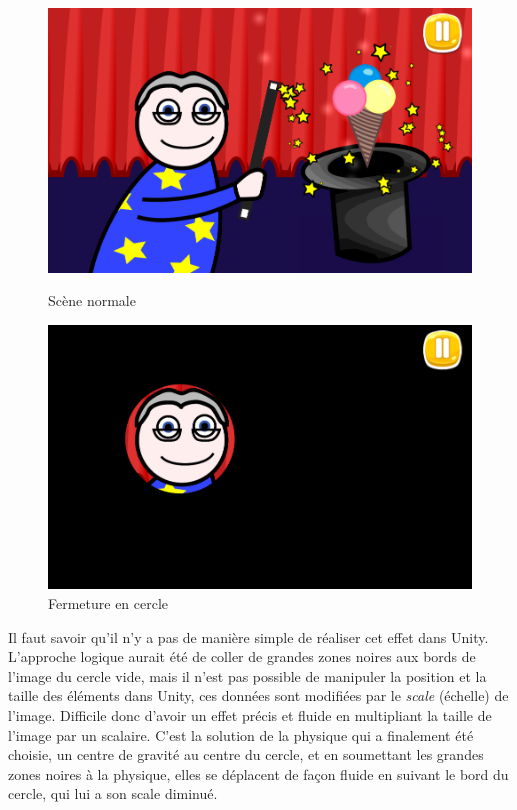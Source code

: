 \begin{figure}[H]\centering
   \begin{minipage}{0.49\textwidth}\centering
     \includegraphics[scale=0.2]{./img/scene.png}
     \caption{Scène normale}
     \label{regular_scene}
   \end{minipage}
   \begin {minipage}{0.49\textwidth}\centering
     \includegraphics[scale=0.2]{./img/cartoon.png}
     \caption{Fermeture en cercle}
     \label{cartoon}
   \end{minipage}
\end{figure}

Il faut savoir qu'il n'y a pas de manière simple de réaliser cet effet dans Unity. L'approche logique aurait été de coller de grandes zones noires aux bords de l'image du cercle vide, mais il n'est pas possible de manipuler la position et la taille des éléments dans Unity, ces données sont modifiées par le \textit{scale} (échelle) de l'image. Difficile donc d'avoir un effet précis et fluide en multipliant la taille de l'image par un scalaire. C'est la solution de la physique qui a finalement été choisie, un centre de gravité au centre du cercle, et en soumettant les grandes zones noires à la physique, elles se déplacent de façon fluide en suivant le bord du cercle, qui lui a son scale diminué.

